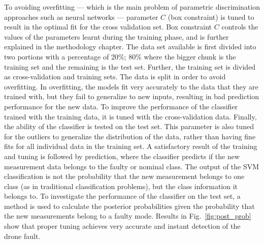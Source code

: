 To avoiding overfitting --- which is the main problem of parametric discrimination approaches such as neural networks --- parameter $C$ (box constraint) is tuned to result in the optimal fit for the cross validation set. Box constraint $C$ controls the values of the parameters learnt during the training phase, and is further explained in the methodology chapter.
The data set available is first divided into two portions with a percentage of 20\%; 80\% where the bigger chunk is the training set and the remaining is the test set. 
Further, the training set is divided as cross-validation and training sets. 
The data is split in order to avoid overfitting. 
In overfitting, the models fit very accurately to the data that they are trained with, but  they fail to generalize to new inputs, resulting in bad prediction performance for the new data. 
To improve the performance of the classifier trained with the training data, it is tuned with the cross-validation data. 
Finally, the ability of the classifier is tested on the test set. 
This parameter is also tuned for the outliers to generalize the distribution of the data, rather than having fine fits for all individual data in the training set. 
A satisfactory result of the training and tuning is followed by prediction, where the classifier predicts if the new measurement data belongs to the faulty or nominal class. 
The output of the SVM classification is not the probability that the new measurement belongs to one class (as in traditional classification problems), but the class information it belongs to. 
To investigate the performance of the classifier on the test set, a method \cite{platt1999probabilistic} is used to calculate the posterior probabilities given the probability that the new measurements belong to a faulty mode. 
Results in Fig.~\ref{fig:post_prob} show that proper tuning achieves very accurate and instant detection of the drone fault. 
   

